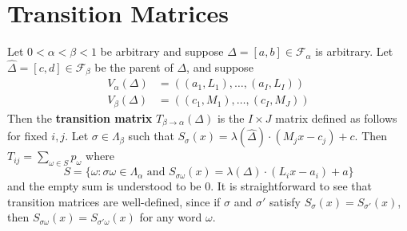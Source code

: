 \documentclass[11pt, a4paper]{memoir}
\theoremstyle{change}
\theoremstyle{plain}
\theoremstyle{nonumberplain}
\numberwithin{equation}{section}
\begin{document}
\section{Transition Matrices}
Let $0<\alpha<\beta<1$ be arbitrary and suppose $\Delta=[a,b]\in\mathcal{F}_\alpha$ is arbitrary.
Let $\widehat\Delta=[c,d]\in\mathcal{F}_\beta$ be the parent of $\Delta$, and suppose
\begin{align*}
    V_\alpha(\Delta) &= ((a_1,L_1),\ldots,(a_I,L_I))\\
    V_\beta(\Delta) &= ((c_1,M_1),\ldots,(c_I,M_J))
\end{align*}
Then the \textbf{transition matrix} $T_{\beta\to\alpha}(\Delta)$ is the $I\times J$ matrix defined as follows for fixed $i,j$.
Let $\sigma\in\Lambda_\beta$ such that $S_\sigma(x)=\lambda(\widehat\Delta)\cdot (M_jx-c_j)+c$.
Then $T_{ij}=\sum_{\omega\in S}p_\omega$ where
\begin{equation*}
    S=\{\omega:\sigma\omega\in\Lambda_\alpha\text{ and }S_{\sigma\omega}(x)=\lambda(\Delta)\cdot(L_ix-a_i)+a\}
\end{equation*}
and the empty sum is understood to be 0.
It is straightforward to see that transition matrices are well-defined, since if $\sigma$ and $\sigma'$ satisfy $S_\sigma(x)=S_{\sigma'}(x)$, then $S_{\sigma\omega}(x)=S_{\sigma'\omega}(x)$ for any word $\omega$.
\end{document}

